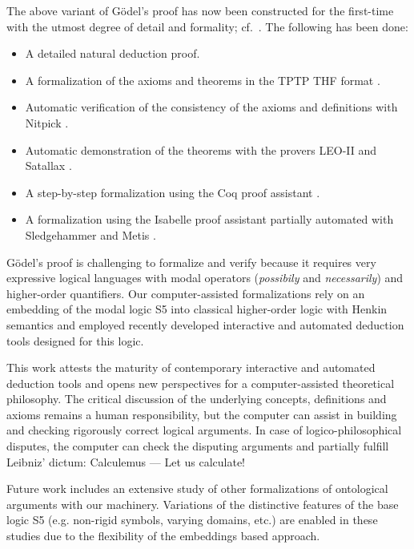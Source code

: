 \documentclass{llncs}
\begin{document}
The above variant of G\"{o}del's proof has now been 
constructed for the first-time
with the utmost degree of detail and formality; cf.~\cite{ToDo:GitHubRepository}. The following has been done:
\begin{itemize}
\item A detailed natural deduction proof.
%
\item A formalization of the axioms and theorems in the TPTP THF format \cite{J22}.
%
\item Automatic verification of the consistency of the axioms and 
definitions with Nitpick \cite{Nitpick}.
%
\item Automatic demonstration of the theorems with the provers LEO-II \cite{LEO-II} and Satallax \cite{Satallax}.

\item A step-by-step formalization using the Coq proof assistant \cite{Coq}.

\item A formalization using the Isabelle proof assistant \cite{Isabelle} partially automated with Sledgehammer \cite{Sledgehammer} and Metis \cite{Hurd03first-orderproof}.
\end{itemize}

G\"{o}del's proof is challenging to formalize and verify 
because it requires very expressive logical languages with 
modal operators (\emph{possibily} and \emph{necessarily}) and higher-order quantifiers. 
Our computer-assisted formalizations rely on an embedding of the modal logic S5 
into classical higher-order logic with Henkin 
semantics \cite{J23,B9} and 
employed recently developed interactive and automated deduction tools designed for this logic.

This work attests the maturity of contemporary interactive and
automated deduction tools and opens new perspectives for a
computer-assisted theoretical philosophy.  
The critical discussion of the underlying concepts, definitions and
axioms remains a human responsibility, but the computer can assist in
building and checking rigorously correct logical arguments. In case of
logico-philosophical disputes, the computer can check the disputing
arguments and partially fulfill Leibniz' dictum: Calculemus --- Let us
calculate!

Future work includes an extensive study of other formalizations of
ontological arguments with our machinery. Variations of the
distinctive features of the base logic S5 (e.g. non-rigid symbols, 
varying domains, etc.) are enabled in these studies due
to the flexibility of the embeddings based approach.



\end{document}
